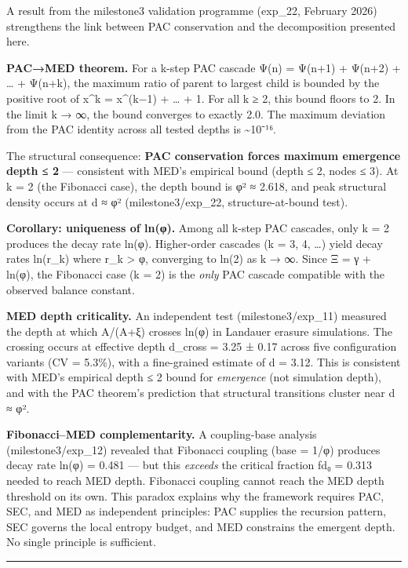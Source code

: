 \documentclass[
  11pt,
  a4paper]{article}
\begin{document}
A result from the milestone3 validation programme (exp\_22, February
2026) strengthens the link between PAC conservation and the
decomposition presented here.

\textbf{PAC→MED theorem.} For a k-step PAC cascade Ψ(n) = Ψ(n+1) +
Ψ(n+2) + \ldots{} + Ψ(n+k), the maximum ratio of parent to largest child
is bounded by the positive root of x\^{}k = x\^{}(k−1) + \ldots{} + 1.
For all k ≥ 2, this bound floors to 2. In the limit k → ∞, the bound
converges to exactly 2.0. The maximum deviation from the PAC identity
across all tested depths is \textasciitilde10⁻¹⁶.

The structural consequence: \textbf{PAC conservation forces maximum
emergence depth ≤ 2} --- consistent with MED's empirical bound (depth ≤
2, nodes ≤ 3). At k = 2 (the Fibonacci case), the depth bound is φ² ≈
2.618, and peak structural density occurs at d ≈ φ² (milestone3/exp\_22,
structure-at-bound test).

\textbf{Corollary: uniqueness of ln(φ).} Among all k-step PAC cascades,
only k = 2 produces the decay rate ln(φ). Higher-order cascades (k = 3,
4, \ldots) yield decay rates ln(r\_k) where r\_k \textgreater{} φ,
converging to ln(2) as k → ∞. Since Ξ = γ + ln(φ), the Fibonacci case (k
= 2) is the \emph{only} PAC cascade compatible with the observed balance
constant.

\textbf{MED depth criticality.} An independent test (milestone3/exp\_11)
measured the depth at which A/(A+ξ) crosses ln(φ) in Landauer erasure
simulations. The crossing occurs at effective depth d\_cross = 3.25 ±
0.17 across five configuration variants (CV = 5.3\%), with a
fine-grained estimate of d = 3.12. This is consistent with MED's
empirical depth ≤ 2 bound for \emph{emergence} (not simulation depth),
and with the PAC theorem's prediction that structural transitions
cluster near d ≈ φ².

\textbf{Fibonacci--MED complementarity.} A coupling-base analysis
(milestone3/exp\_12) revealed that Fibonacci coupling (base = 1/φ)
produces decay rate ln(φ) = 0.481 --- but this \emph{exceeds} the
critical fraction fd₀ = 0.313 needed to reach MED depth. Fibonacci
coupling cannot reach the MED depth threshold on its own. This paradox
explains why the framework requires PAC, SEC, and MED as independent
principles: PAC supplies the recursion pattern, SEC governs the local
entropy budget, and MED constrains the emergent depth. No single
principle is sufficient.

\begin{center}\rule{0.5\linewidth}{0.5pt}\end{center}
\end{document}
